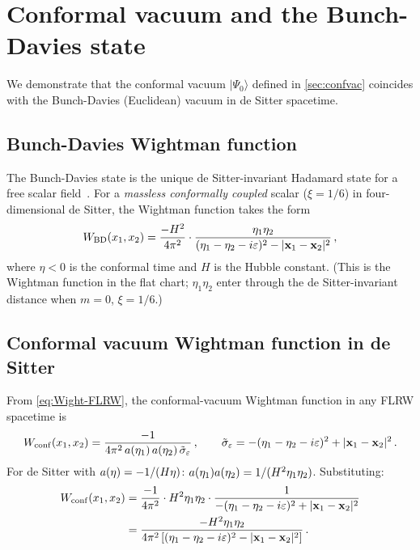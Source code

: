 
\section{Conformal vacuum and the Bunch-Davies state}
\label{app:bunch-davies}

We demonstrate that the conformal vacuum $|\Psi_{0}\rangle$ defined in
\cref{sec:confvac} coincides with the Bunch-Davies (Euclidean) vacuum in
de Sitter spacetime.

\subsection*{Bunch-Davies Wightman function}

The Bunch-Davies state is the unique de Sitter-invariant Hadamard state for a
free scalar field~\cite{Allen1985}.  For a \emph{massless conformally coupled}
scalar ($\xi = 1/6$) in four-dimensional de Sitter, the Wightman function takes
the form~\cite{BunchDavies1978,Allen1985}
%
\begin{equation}
  W_{\rm BD}(x_{1},x_{2})
  =
  \frac{-H^{2}}{4\pi^{2}}
  \cdot
  \frac{\eta_{1}\eta_{2}}{(\eta_{1}-\eta_{2}-i\varepsilon)^{2}-|\mathbf{x}_{1}-\mathbf{x}_{2}|^{2}} \,,
  \label{eq:app-W-BD}
\end{equation}
%
where $\eta < 0$ is the conformal time and $H$ is the Hubble constant.
(This is the Wightman function in the flat chart; $\eta_{1}\eta_{2}$ enter through
the de Sitter-invariant distance when $m=0$, $\xi=1/6$.)

\subsection*{Conformal vacuum Wightman function in de Sitter}

From \cref{eq:Wight-FLRW}, the conformal-vacuum Wightman function in any FLRW spacetime is
%
\begin{equation}
  W_{\rm conf}(x_{1},x_{2})
  =
  \frac{-1}{4\pi^{2}\,a(\eta_{1})\,a(\eta_{2})\,\tilde{\sigma}_{\varepsilon}} \,,
  \qquad
  \tilde{\sigma}_{\varepsilon} = -(\eta_{1}-\eta_{2}-i\varepsilon)^{2}+|\mathbf{x}_{1}-\mathbf{x}_{2}|^{2} \,.
\end{equation}
%
For de Sitter with $a(\eta) = -1/(H\eta)$:
$a(\eta_{1})a(\eta_{2}) = 1/(H^{2}\eta_{1}\eta_{2})$.
Substituting:
%
\begin{align}
  W_{\rm conf}(x_{1},x_{2})
  &=
  \frac{-1}{4\pi^{2}}
  \cdot H^{2}\eta_{1}\eta_{2}
  \cdot
  \frac{1}{-(\eta_{1}-\eta_{2}-i\varepsilon)^{2}+|\mathbf{x}_{1}-\mathbf{x}_{2}|^{2}} \nonumber\\
  &=
  \frac{-H^{2}\eta_{1}\eta_{2}}{4\pi^{2}\left[(\eta_{1}-\eta_{2}-i\varepsilon)^{2}-|\mathbf{x}_{1}-\mathbf{x}_{2}|^{2}\right]} \,.
  \label{eq:app-W-conf-dS}
\end{align}

